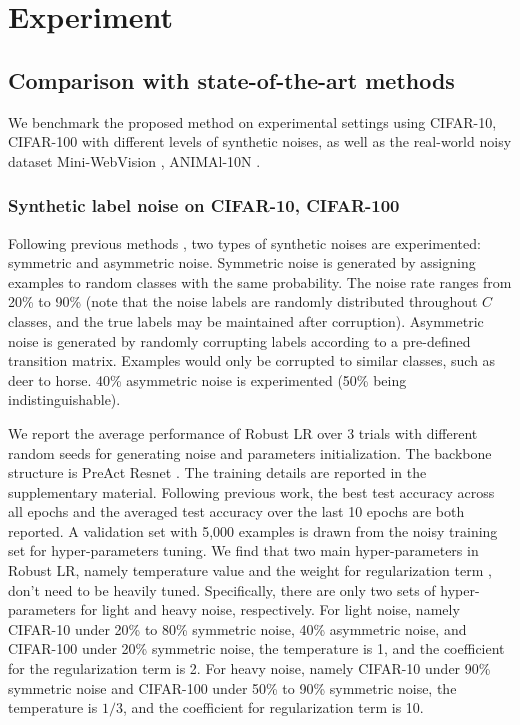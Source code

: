 \documentclass[letterpaper]{article} \usepackage{aaai23}  \usepackage{times}  \usepackage{helvet}  \usepackage{courier}  \usepackage[hyphens]{url}  \usepackage{graphicx} \urlstyle{rm} \def\UrlFont{\rm}  \usepackage{natbib}  \usepackage{caption} \frenchspacing  \setlength{\pdfpagewidth}{8.5in} \setlength{\pdfpageheight}{11in} \usepackage{algorithm}
\begin{document}
\section{Experiment}
\subsection{Comparison with state-of-the-art methods}
We benchmark the proposed method on experimental settings using CIFAR-10, CIFAR-100 \cite{krizhevsky2009learning} with different levels of synthetic noises, as well as the real-world noisy dataset Mini-WebVision \cite{li2017webvision},  ANIMAl-10N \cite{DBLP:conf/icml/SongK019}.
\subsubsection{Synthetic label noise on CIFAR-10, CIFAR-100}

Following previous methods \cite{kim2019nlnl,li2020dividemix}, two types of synthetic noises are experimented: symmetric and asymmetric noise.
Symmetric noise is generated by assigning examples to random classes with the same probability.
The noise rate ranges from 20\% to 90\% (note that the noise labels are randomly distributed throughout $C$ classes, and the true labels may be maintained after corruption).
Asymmetric noise is generated by randomly corrupting labels according to a pre-defined transition matrix. 
Examples would only be corrupted to similar classes, such as deer to horse. 
40\% asymmetric noise is experimented (50\% being indistinguishable).

We report the average performance of Robust LR over 3 trials with different random seeds for generating noise and parameters initialization.
The backbone structure is PreAct Resnet \cite{he2016deep}. 
The training details are reported in the supplementary material.
Following previous work, the best test accuracy across all epochs and the averaged test accuracy over the last 10 epochs are both reported.
A validation set with 5,000 examples is drawn from the noisy training set for hyper-parameters tuning.
We find that two main hyper-parameters in Robust LR, namely temperature value and the weight for regularization term \cite{tanaka2018joint,arazo2019unsupervised}, don't need to be heavily tuned. 
Specifically, there are only two sets of hyper-parameters for light and heavy noise, respectively.
For light noise, namely CIFAR-10 under 20\% to 80\% symmetric noise, 40\% asymmetric noise, and CIFAR-100 under 20\% symmetric noise, the temperature is 1, and the coefficient for the regularization term is 2.
For heavy noise, namely CIFAR-10 under 90\% symmetric noise and CIFAR-100 under 50\% to 90\% symmetric noise, the temperature is $1/3$, and the coefficient for regularization term is 10.
\end{document}
